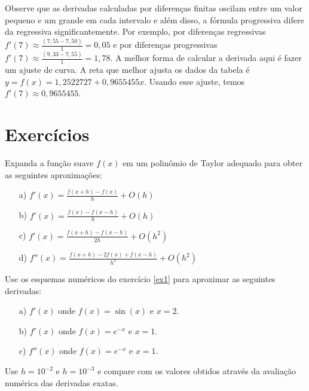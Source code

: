 Observe que as derivadas calculadas por diferenças finitas oscilam entre um valor pequeno e um grande em cada intervalo e além disso, a fórmula progressiva difere da regressiva significantemente. Por exemplo, por diferenças regressivas $f'(7)\approx \frac{(7,55 -  7,50)}{1}=0,05$ e por diferenças progressivas $f'(7)\approx \frac{(9,33 -  7,55)}{1}=1,78$. A melhor forma de calcular a derivada aqui é fazer um ajuste de curva. A reta que melhor ajusta os dados da tabela é $y=f(x)=1,2522727+0,9655455x$. Usando esse ajuste, temos $f'(7)\approx 0,9655455$.

\section*{Exercícios}

\begin{Exercise} Expanda a função suave $f(x)$ em um polinômio de Taylor adequado para obter as seguintes aproximações:
\begin{itemize}{\label{ex1}}
\item[a)] $f'(x)=\frac{f(x+h)-f(x)}{h}+O(h)$
\item[b)] $f'(x)=\frac{f(x)-f(x-h)}{h}+O(h)$
\item[c)] $f'(x)=\frac{f(x+h)-f(x-h)}{2h}+O(h^2)$
\item[d)] $f''(x)=\frac{f(x+h)-2f(x)+f(x-h)}{h^2}+O(h^2)$
\end{itemize}
\end{Exercise}

\begin{Exercise}
Use os esquemas numéricos do exercício \ref{ex1} para aproximar as seguintes derivadas:
\begin{itemize}
\item[a)] $f'(x)$ onde $f(x)=\sin(x)$ e $x=2$.
\item[b)] $f'(x)$ onde $f(x)=e^{-x}$ e $x=1$.
\item[c)] $f''(x)$ onde $f(x)=e^{-x}$ e $x=1$.
\end{itemize}

Use $h=10^{-2}$ e $h=10^{-3}$ e compare com os valores obtidos através da avaliação numérica das derivadas exatas.
\end{Exercise}

